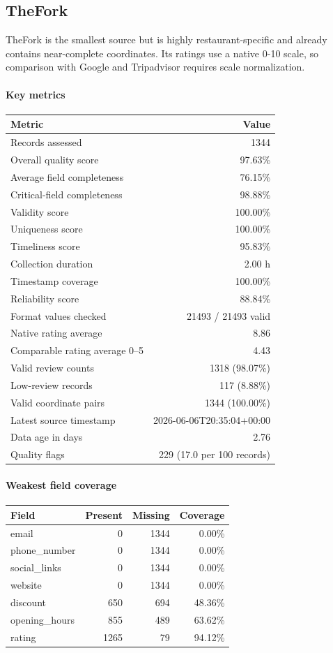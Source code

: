 \subsection{TheFork}

TheFork is the smallest source but is highly restaurant-specific and already contains near-complete coordinates. Its ratings use a native 0-10 scale, so comparison with Google and Tripadvisor requires scale normalization.

\paragraph{Key metrics}
\begin{tabular}{lr}
\toprule
Metric & Value \\
\midrule
Records assessed & 1344 \\
Overall quality score & 97.63\% \\
Average field completeness & 76.15\% \\
Critical-field completeness & 98.88\% \\
Validity score & 100.00\% \\
Uniqueness score & 100.00\% \\
Timeliness score & 95.83\% \\
Collection duration & 2.00 h \\
Timestamp coverage & 100.00\% \\
Reliability score & 88.84\% \\
Format values checked & 21493 / 21493 valid \\
Native rating average & 8.86 \\
Comparable rating average 0--5 & 4.43 \\
Valid review counts & 1318 (98.07\%) \\
Low-review records & 117 (8.88\%) \\
Valid coordinate pairs & 1344 (100.00\%) \\
Latest source timestamp & 2026-06-06T20:35:04+00:00 \\
Data age in days & 2.76 \\
Quality flags & 229 (17.0 per 100 records) \\
\bottomrule
\end{tabular}

\paragraph{Weakest field coverage}
\begin{tabular}{lrrr}
\toprule
Field & Present & Missing & Coverage \\
\midrule
email & 0 & 1344 & 0.00\% \\
phone\_number & 0 & 1344 & 0.00\% \\
social\_links & 0 & 1344 & 0.00\% \\
website & 0 & 1344 & 0.00\% \\
discount & 650 & 694 & 48.36\% \\
opening\_hours & 855 & 489 & 63.62\% \\
rating & 1265 & 79 & 94.12\% \\
\bottomrule
\end{tabular}

